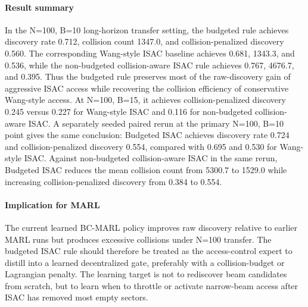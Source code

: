 \paragraph*{Result summary}
In the N=100, B=10 long-horizon transfer setting, the budgeted rule achieves discovery rate 0.712, collision count 1347.0, and collision-penalized discovery 0.560.
The corresponding Wang-style ISAC baseline achieves 0.681, 1343.3, and 0.536, while the non-budgeted collision-aware ISAC rule achieves 0.767, 4676.7, and 0.395.
Thus the budgeted rule preserves most of the raw-discovery gain of aggressive ISAC access while recovering the collision efficiency of conservative Wang-style access.
At N=100, B=15, it achieves collision-penalized discovery 0.245 versus 0.227 for Wang-style ISAC and 0.116 for non-budgeted collision-aware ISAC.
A separately seeded paired rerun at the primary N=100, B=10 point gives the same conclusion: Budgeted ISAC achieves discovery rate 0.724 and collision-penalized discovery 0.554, compared with 0.695 and 0.530 for Wang-style ISAC.
Against non-budgeted collision-aware ISAC in the same rerun, Budgeted ISAC reduces the mean collision count from 5300.7 to 1529.0 while increasing collision-penalized discovery from 0.384 to 0.554.

\paragraph*{Implication for MARL}
The current learned BC-MARL policy improves raw discovery relative to earlier MARL runs but produces excessive collisions under N=100 transfer.
The budgeted ISAC rule should therefore be treated as the access-control expert to distill into a learned decentralized gate, preferably with a collision-budget or Lagrangian penalty.
The learning target is not to rediscover beam candidates from scratch, but to learn when to throttle or activate narrow-beam access after ISAC has removed most empty sectors.

